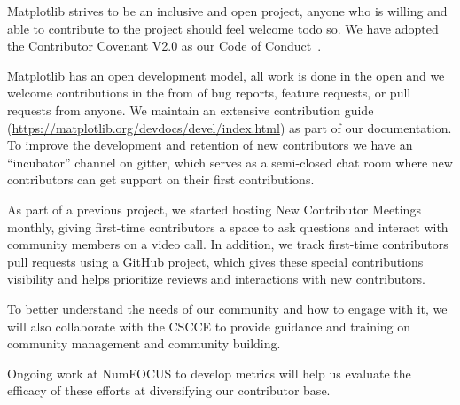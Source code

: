 \documentclass[12pt]{article}
\numberwithin{page}{section}
\begin{document}

Matplotlib strives to be an inclusive and open project, anyone who is willing
and able to contribute to the project should feel welcome todo so. We have
adopted the Contributor Covenant V2.0 as our Code of Conduct~\cite{CoC}.

Matplotlib has an open development model, all work is done in the open and we
welcome contributions in the from of bug reports, feature requests, or pull
requests from anyone. We maintain an extensive contribution guide
(\url{https://matplotlib.org/devdocs/devel/index.html}) as part of our
documentation. To improve the development and retention of new contributors we
have an ``incubator'' channel on gitter, which serves as a semi-closed chat
room where new contributors can get support on their first contributions.

As part of a previous project, we started hosting New Contributor Meetings
monthly, giving first-time contributors a space to ask questions and interact
with community members on a video call. In addition, we track first-time
contributors pull requests using a GitHub project, which gives these special
contributions visibility and helps prioritize reviews and interactions with new
contributors.

To better understand the needs of our community and how to engage with it, we
will also collaborate with the CSCCE to provide guidance and training on
community management and community building.

Ongoing work at NumFOCUS to develop metrics will help us evaluate the efficacy
of these efforts at diversifying our contributor base.
\end{document}
